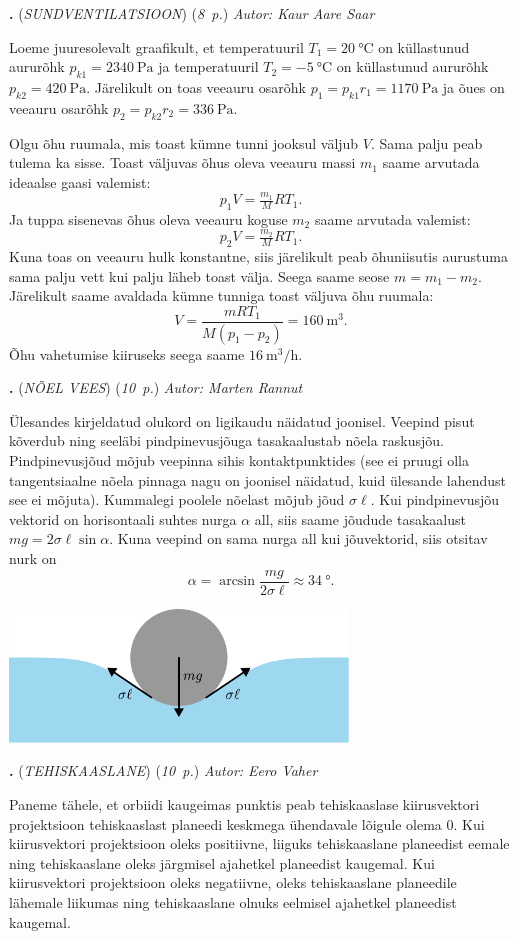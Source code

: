 \documentclass[11pt,a5paper]{article}
\newcommand{\numb}[1]{\vspace{5pt}\textbf{\large #1}}
\newcommand{\nimi}[1]{(\textsl{\small \uppercase{#1}})}
\newcommand{\punktid}[1]{(\emph{#1~p.})}
\newcounter{ylesanne}
\newcommand{\yl}[1]{\addtocounter{ylesanne}{1}\numb{\theylesanne.} \nimi{#1} \newblock{}}
\newcommand{\autor}[1]{\emph{Autor: #1}}%
\begin{document}
\yl{Sundventilatsioon}
\punktid{8} \autor{Kaur Aare Saar}\par
Loeme juuresolevalt graafikult, et temperatuuril $T_1 = \SI{20}{\celsius}$ on küllastunud aururõhk $p_{k1} = \SI{2340}{\pascal}$ ja temperatuuril $T_2 = \SI{-5}{\celsius}$ on küllastunud aururõhk $p_{k2} = \SI{420}{\pascal}$. Järelikult on toas veeauru osarõhk $p_1 = p_{k1} r_1 = \SI{1170}{\pascal}$ ja õues on veeauru osarõhk $p_2 = p_{k2} r_2 = \SI{336}{\pascal}$.

Olgu õhu ruumala, mis toast kümne tunni jooksul väljub $V$. Sama palju peab tulema ka sisse.
Toast väljuvas õhus oleva veeauru massi $m_1$ saame arvutada ideaalse gaasi valemist:
$$p_1V = \tfrac {m_1}M RT_1.$$
Ja tuppa sisenevas õhus oleva veeauru koguse $m_2$ saame arvutada valemist:
$$p_2V = \tfrac {m_2}M RT_1.$$
Kuna toas on veeauru hulk konstantne, siis järelikult peab õhuniisutis aurustuma sama palju vett kui palju läheb toast välja. Seega saame seose $m = m_1 - m_2$. Järelikult saame avaldada kümne tunniga toast väljuva õhu ruumala:
$$V = \frac{mRT_1}{M(p_1-p_2)} = \SI{160}{\meter\cubed}.$$
Õhu vahetumise kiiruseks seega saame $\SI{16}{\meter\cubed\per\hour}$.

\newpage
\yl{Nõel vees}
\punktid{10} \autor{Marten Rannut}\par
Ülesandes kirjeldatud olukord on ligikaudu näidatud joonisel. Veepind pisut kõverdub ning seeläbi pindpinevusjõuga tasakaalustab nõela raskusjõu. Pindpinevusjõud mõjub veepinna sihis kontaktpunktides (see ei pruugi olla tangentsiaalne nõela pinnaga nagu on joonisel näidatud, kuid ülesande lahendust see ei mõjuta). Kummalegi poolele nõelast mõjub jõud $\sigma \ell$. Kui pindpinevusjõu vektorid on horisontaali suhtes nurga $\alpha$ all, siis saame jõudude tasakaalust \(mg = 2 \sigma \ell \sin \alpha\). Kuna veepind on sama nurga all kui jõuvektorid, siis otsitav nurk on
\[
\alpha = \arcsin{\frac{mg}{2\sigma \ell}} \approx \SI{34}{\degree}.
\]
\begin{center}
  \includegraphics[width=9cm]{noel-lah.pdf}
\end{center}

\yl{TEHISKAASLANE}
\punktid{10} \autor{Eero Vaher}\par
Paneme tähele, et orbiidi kaugeimas punktis peab tehiskaaslase kiirusvektori projektsioon tehiskaaslast planeedi keskmega ühendavale lõigule olema $0$. Kui kiirusvektori projektsioon oleks positiivne, liiguks tehiskaaslane planeedist eemale ning tehiskaaslane oleks järgmisel ajahetkel planeedist kaugemal. Kui kiirusvektori projektsioon oleks negatiivne, oleks tehiskaaslane planeedile lähemale liikumas ning tehiskaaslane olnuks eelmisel ajahetkel planeedist kaugemal.
\end{document}
